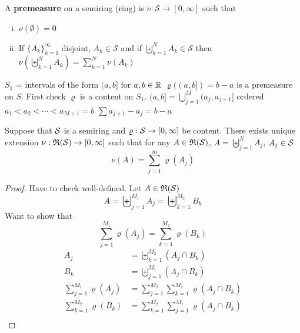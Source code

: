 \begin{definition}
  A \textbf{premeasure} on a semiring (ring) is $\nu: \mathcal{S} \to [0, \infty]$ such that
  \begin{enumerate}[(i)]
    \item $\nu(\emptyset) = 0$
    \item If $\{A_k\}_{k=1}^\infty$ disjoint, $A_k \in \mathcal{S}$ and if $\biguplus_{k=1}^N A_k \in \mathcal{S}$ then 
      $\nu\left(\biguplus_{k=1}^N A_k\right) = \sum_{k=1}^N \nu(A_k)$
  \end{enumerate}
\end{definition}

\begin{example}
  $S_1$ = intervals of the form $(a, b]$ for $a, b\in \mathbb R$
  $\varrho((a, b]) = b-a$ is a premeasure on $S$.
  First check $\varrho$ is a content on $S_1$.
  $(a, b] = \bigcup_{j=1}^M (a_j, a_{j+1}]$ ordered $a_1 < a_2 < \dotsm < a_{M+1} = b$
  $\sum a_{j+1} - a_j = b-a$
\end{example}


\begin{theorem}
  Suppose that $\mathcal S$ is a semiring and $\varrho: \mathcal S \to [0, \infty]$ be content. 
  There exists unique extension $\nu: \mathfrak R(\mathcal S) \to [0, \infty]$ such that for any 
  $A \in \mathfrak R(\mathcal S)$, $A = \biguplus_{j=1}^N A_j$, $A_j \in \mathcal S$
  \[\nu(A) = \sum_{j=1}^m \varrho(A_j)\]
\end{theorem}

\begin{proof}
  Have to check well-defined.  
  Let $A \in \mathfrak R(\mathcal S)$
  \[A = \biguplus_{j=1}^{M_1} A_j = \biguplus_{k=1}^{M_2} B_k \]
  Want to show that
  \[\sum_{j=1}^{M_1} \varrho(A_j) = \sum_{k=1}^{M_2} \varrho(B_k)\]
  \begin{align*}
    A_j &= \biguplus_{k=1}^{M_2} (A_j \cap B_k) \\
    B_k &= \biguplus_{j=1}^{M_1} (A_j \cap B_k) \\
    \sum_{j=1}^{M_1} \varrho(A_j) &= \sum_{j=1}^{M_2} \sum_{k=1}^{M_2} \varrho(A_j \cap B_k) \\
    \sum_{k=1}^{M_2} \varrho(B_k) &= \sum_{k=1}^{M_2} \sum_{j=1}^{M_1} \varrho(A_j \cap B_k) \\
  \end{align*}
\end{proof}

